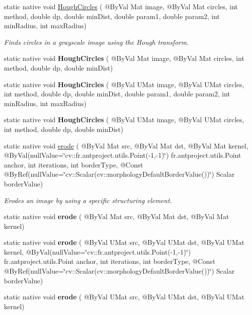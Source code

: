 \begin{DoxyCompactItemize}
\item 
static native void \hyperlink{group__imgproc__feature_ga600228eea1d6673137492fb0d0c1b8d5}{Hough\+Circles} ( @By\+Val Mat image, @By\+Val Mat circles, int method, double dp, double min\+Dist, double param1, double param2, int min\+Radius, int max\+Radius)
\begin{DoxyCompactList}\small\item\em Finds circles in a grayscale image using the Hough transform. \end{DoxyCompactList}\item 
static native void {\bfseries Hough\+Circles} ( @By\+Val Mat image, @By\+Val Mat circles, int method, double dp, double min\+Dist)
\item 
static native void {\bfseries Hough\+Circles} ( @By\+Val U\+Mat image, @By\+Val U\+Mat circles, int method, double dp, double min\+Dist, double param1, double param2, int min\+Radius, int max\+Radius)
\item 
static native void {\bfseries Hough\+Circles} ( @By\+Val U\+Mat image, @By\+Val U\+Mat circles, int method, double dp, double min\+Dist)
\item 
static native void \hyperlink{group__imgproc__filter_ga8c0cbcc8dd271aada560698924d19cb2}{erode} ( @By\+Val Mat src, @By\+Val Mat dst, @By\+Val Mat kernel, @By\+Val(null\+Value=\char`\"{}cv\+::\+fr.antproject.utils.Point(-\/1,-\/1)\char`\"{}) fr.antproject.utils.Point anchor, int iterations, int border\+Type, @Const @By\+Ref(null\+Value=\char`\"{}cv\+::\+Scalar(cv\+::morphology\+Default\+Border\+Value())\char`\"{}) Scalar border\+Value)
\begin{DoxyCompactList}\small\item\em Erodes an image by using a specific structuring element. \end{DoxyCompactList}\item 
static native void {\bfseries erode} ( @By\+Val Mat src, @By\+Val Mat dst, @By\+Val Mat kernel)
\item 
static native void {\bfseries erode} ( @By\+Val U\+Mat src, @By\+Val U\+Mat dst, @By\+Val U\+Mat kernel, @By\+Val(null\+Value=\char`\"{}cv\+::\+fr.antproject.utils.Point(-\/1,-\/1)\char`\"{}) fr.antproject.utils.Point anchor, int iterations, int border\+Type, @Const @By\+Ref(null\+Value=\char`\"{}cv\+::\+Scalar(cv\+::morphology\+Default\+Border\+Value())\char`\"{}) Scalar border\+Value)
\item 
static native void {\bfseries erode} ( @By\+Val U\+Mat src, @By\+Val U\+Mat dst, @By\+Val U\+Mat kernel)

\end{DoxyCompactItemize}
